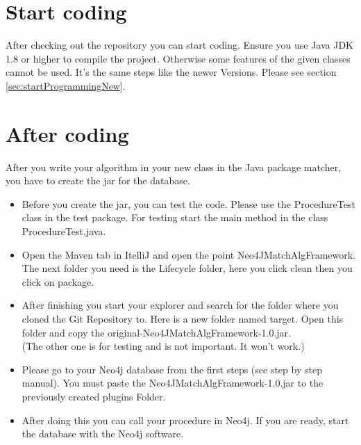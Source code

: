 \section{Start coding}\label{sec:startProgramming}
After checking out the repository you can start coding. Ensure you use Java JDK 1.8 or higher to compile the project. Otherwise some features of the given classes cannot be used. It's the same steps like the newer Versions. Please see section \ref{sec:startProgrammingNew}.

\section{After coding}\label{sec:afterProgramming}
After you write your algorithm in your new class in the Java package matcher, you have to create the \glqq jar\grqq{} for the database.
\begin{itemize}
	\item Before you create the jar, you can test the code. Please use the \glqq ProcedureTest\grqq{} class in the test package. For testing start the main method in the class \glqq ProcedureTest.java\grqq{}.
	\item Open the Maven tab in \glqq ItelliJ \grqq{} and open the point \glqq Neo4JMatchAlgFramework\grqq{}. The next folder you need is the \glqq Lifecycle\grqq{} folder, here you click \glqq clean\grqq{} then you click on \glqq package\grqq{}.
	\item After finishing you start your explorer and search for the folder where you cloned the \glqq Git Repository\grqq{} to. Here is a new folder named target. Open this folder and copy the \glqq original-Neo4JMatchAlgFramework-1.0.jar\grqq{}. \\
	(The other one is for testing and is not important. It won't work.)
	\item Please go to your Neo4j database from the first steps (see step by step manual).%
	You must paste the \glqq Neo4JMatchAlgFramework-1.0.jar\grqq{} to the previously created \glqq plugins\grqq{} Folder.
	\item After doing this you can call your procedure in Neo4j. If you are ready, start the database with the Neo4j software.
\end{itemize}

